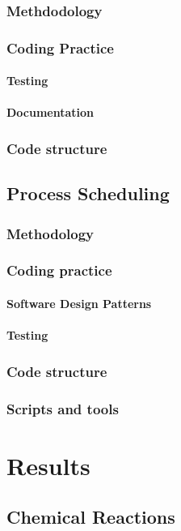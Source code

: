 \documentclass[12pt,a4paper]{report}
\begin{document}
\subsection{Methdodology}
\subsection{Coding Practice}
\subsubsection{Testing}
\subsubsection{Documentation}
\subsection{Code structure}

\section{Process Scheduling}
\subsection{Methodology}
\subsection{Coding practice}
\subsubsection{Software Design Patterns}
\subsubsection{Testing}
\subsection{Code structure}
\subsection{Scripts and tools}

\chapter{Results}

	\section{Chemical Reactions}
	
\end{document}
